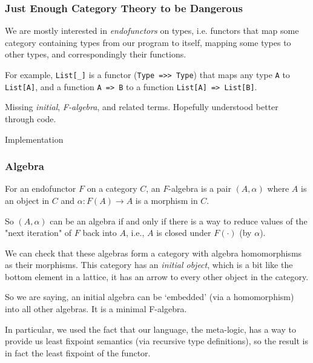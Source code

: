 \documentclass[
  aspectratio=1610, 
  xcolor={dvipsnames},
]{beamer}
\begin{document}
\begin{frame}
  \frametitle{Just Enough Category Theory to be Dangerous}

  We are mostly interested in \emph{endofunctors} on types, i.e. functors that
  map some category containing types from our program to itself, mapping some
  types to other types, and correspondingly their functions.

  \pause
  For example, \lstinline|List[_]| is a functor (\lstinline|Type =>> Type|) that
  maps any type \lstinline|A| to \lstinline|List[A]|, and a function
  \lstinline|A => B| to a function \lstinline|List[A] => List[B]|.

\end{frame}

\begin{frame}

  Missing \emph{initial}, \emph{F-algebra}, and related terms. Hopefully
  understood better through code.

  \begin{center}
    \Huge Implementation
  \end{center}

\end{frame}


\begin{frame}
  \frametitle{Algebra}

  For an endofunctor \(F\) on a category \(C\), an \(F\)-algebra is a pair \((A,
  \alpha)\) where \(A\) is an object in \(C\) and \(\alpha: F(A) \to A\) is a
  morphism in \(C\).

  \pause

  So \((A, \alpha)\) can be an algebra if and only if there is a way to reduce
  values of the "next iteration" of \(F\) back into \(A\), i.e., \(A\) is closed
  under \(F(\cdot)\) (by \(\alpha\)).
  
  \pause

  We can check that these algebras form a category with algebra homomorphisms as
  their morphisms. This category has an \emph{initial object}, which is a bit
  like the bottom element in a lattice, it has an arrow to every other object in
  the category.

  So we are saying, an initial algebra can be `embedded' (via a homomorphism) into
  all other algebras. It is a minimal F-algebra. 

  In particular, we used the fact that our language, the meta-logic, has a way
  to provide us least fixpoint semantics (via recursive type definitions), so
  the result is in fact the least fixpoint of the functor.

\end{frame}
\end{document}
